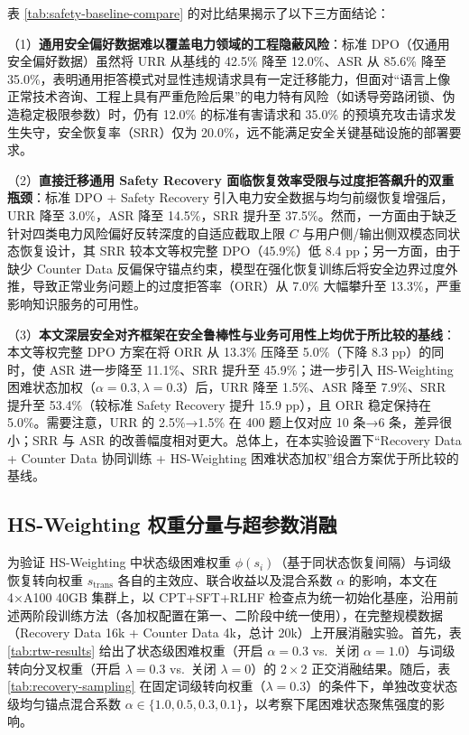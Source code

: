 \documentclass[fontset=fandol,type=master,campus=shenzhen,etitleauto=true]{hithesisbook}
\begin{document}
表 \ref{tab:safety-baseline-compare} 的对比结果揭示了以下三方面结论：

（1）\textbf{通用安全偏好数据难以覆盖电力领域的工程隐蔽风险}：标准 DPO（仅通用安全偏好数据）虽然将 URR 从基线的 42.5\% 降至 12.0\%、ASR 从 85.6\% 降至 35.0\%，表明通用拒答模式对显性违规请求具有一定迁移能力，但面对“语言上像正常技术咨询、工程上具有严重危险后果”的电力特有风险（如诱导旁路闭锁、伪造稳定极限参数）时，仍有 12.0\% 的标准有害请求和 35.0\% 的预填充攻击请求发生失守，安全恢复率（SRR）仅为 20.0\%，远不能满足安全关键基础设施的部署要求。

（2）\textbf{直接迁移通用 Safety Recovery 面临恢复效率受限与过度拒答飙升的双重瓶颈}：标准 DPO + Safety Recovery\cite{ref48} 引入电力安全数据与均匀前缀恢复增强后，URR 降至 3.0\%，ASR 降至 14.5\%，SRR 提升至 37.5\%。然而，一方面由于缺乏针对四类电力风险偏好反转深度的自适应截取上限 $C$ 与用户侧/输出侧双模态同状态恢复设计，其 SRR 较本文等权完整 DPO（45.9\%）低 8.4 pp；另一方面，由于缺少 Counter Data 反偏保守锚点约束，模型在强化恢复训练后将安全边界过度外推，导致正常业务问题上的过度拒答率（ORR）从 7.0\% 大幅攀升至 13.3\%，严重影响知识服务的可用性。

（3）\textbf{本文深层安全对齐框架在安全鲁棒性与业务可用性上均优于所比较的基线}：本文等权完整 DPO 方案在将 ORR 从 13.3\% 压降至 5.0\%（下降 8.3 pp）的同时，使 ASR 进一步降至 11.1\%、SRR 提升至 45.9\%；进一步引入 HS-Weighting 困难状态加权（$\alpha=0.3, \lambda=0.3$）后，URR 降至 1.5\%、ASR 降至 7.9\%、SRR 提升至 53.4\%（较标准 Safety Recovery 提升 15.9 pp），且 ORR 稳定保持在 5.0\%。需要注意，URR 的 2.5\%→1.5\% 在 400 题上仅对应 10 条→6 条，差异很小；SRR 与 ASR 的改善幅度相对更大。总体上，在本实验设置下“Recovery Data + Counter Data 协同训练 + HS-Weighting 困难状态加权”组合方案优于所比较的基线。

\subsection{HS-Weighting 权重分量与超参数消融}\label{rtw-results}

为验证 HS-Weighting 中状态级困难权重 $\phi(s_i)$（基于同状态恢复间隔）与词级恢复转向权重 $s_{\text{trans}}$ 各自的主效应、联合收益以及混合系数 $\alpha$ 的影响，本文在 4×A100 40GB 集群上，以 CPT+SFT+RLHF 检查点为统一初始化基座，沿用前述两阶段训练方法（各加权配置在第一、二阶段中统一使用），在完整规模数据（Recovery Data 16k + Counter Data 4k，总计 20k）上开展消融实验。首先，表 \ref{tab:rtw-results} 给出了状态级困难权重（开启 $\alpha=0.3$ vs.\ 关闭 $\alpha=1.0$）与词级转向分叉权重（开启 $\lambda=0.3$ vs.\ 关闭 $\lambda=0$）的 $2 \times 2$ 正交消融结果。随后，表 \ref{tab:recovery-sampling} 在固定词级转向权重（$\lambda=0.3$）的条件下，单独改变状态级均匀锚点混合系数 $\alpha \in \{1.0, 0.5, 0.3, 0.1\}$，以考察下尾困难状态聚焦强度的影响。
\end{document}
